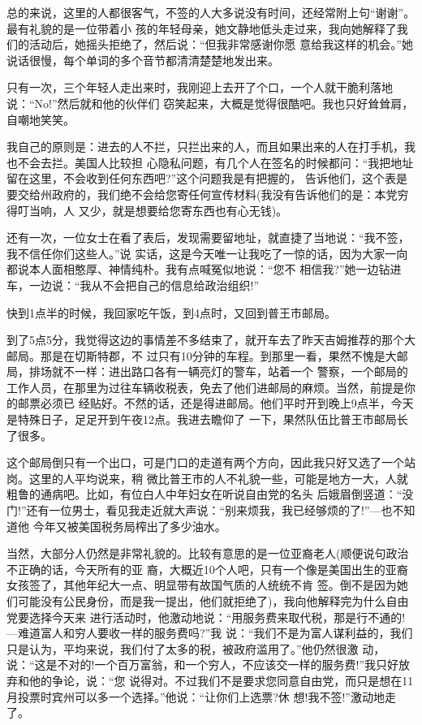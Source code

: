 ﻿\documentclass[11pt]{article}
\begin{document}
总的来说，这里的人都很客气，不签的人大多说没有时间，还经常附上句``谢谢''。最有礼貌的是一位带着小
孩的年轻母亲，她文静地低头走过来，我向她解释了我们的活动后，她摇头拒绝了，然后说：``但我非常感谢你愿
意给我这样的机会。''她说话很慢，每个单词的多个音节都清清楚楚地发出来。

只有一次，三个年轻人走出来时，我刚迎上去开了个口，一个人就干脆利落地说：``No!''然后就和他的伙伴们
窃笑起来，大概是觉得很酷吧。我也只好耸耸肩，自嘲地笑笑。

我自己的原则是：进去的人不拦，只拦出来的人，而且如果出来的人在打手机，我也不会去拦。美国人比较担
心隐私问题，有几个人在签名的时候都问：``我把地址留在这里，不会收到任何东西吧?''这个问题我是有把握的，
告诉他们，这个表是要交给州政府的，我们绝不会给您寄任何宣传材料(我没有告诉他们的是：本党穷得叮当响，人
又少，就是想要给您寄东西也有心无钱)。

还有一次，一位女士在看了表后，发现需要留地址，就直捷了当地说：``我不签，我不信任你们这些人。''说
实话，这是今天唯一让我吃了一惊的话，因为大家一向都说本人面相憨厚、神情纯朴。我有点喊冤似地说：``您不
相信我?''她一边钻进车，一边说：``我从不会把自己的信息给政治组织!''

快到1点半的时候，我回家吃午饭，到4点时，又回到普王市邮局。

到了5点5分，我觉得这边的事情差不多结束了，就开车去了昨天吉姆推荐的那个大邮局。那是在切斯特郡，不
过只有10分钟的车程。到那里一看，果然不愧是大邮局，排场就不一样：进出路口各有一辆亮灯的警车，站着一个
警察，一个邮局的工作人员，在那里为过往车辆收税表，免去了他们进邮局的麻烦。当然，前提是你的邮票必须已
经贴好。不然的话，还是得进邮局。他们平时开到晚上9点半，今天是特殊日子，足足开到午夜12点。我进去瞻仰了
一下，果然队伍比普王市邮局长了很多。

这个邮局倒只有一个出口，可是门口的走道有两个方向，因此我只好又选了一个站岗。这里的人平均说来，稍
微比普王市的人不礼貌一些，可能是地方一大，人就粗鲁的通病吧。比如，有位白人中年妇女在听说自由党的名头
后娥眉倒竖道：``没门!''还有一位男士，看见我走近就大声说：``别来烦我，我已经够烦的了!''---也不知道他
今年又被美国税务局榨出了多少油水。

当然，大部分人仍然是非常礼貌的。比较有意思的是一位亚裔老人(顺便说句政治不正确的话，今天所有的亚
裔，大概近10个人吧，只有一个像是美国出生的亚裔女孩签了，其他年纪大一点、明显带有故国气质的人统统不肯
签。倒不是因为她们可能没有公民身份，而是我一提出，他们就拒绝了)，我向他解释完为什么自由党要选择今天来
进行活动时，他激动地说：``用服务费来取代税，那是行不通的!---难道富人和穷人要收一样的服务费吗?''我
说：``我们不是为富人谋利益的，我们只是认为，平均来说，我们付了太多的税，被政府滥用了。''他仍然很激
动，说：``这是不对的!一个百万富翁，和一个穷人，不应该交一样的服务费!''我只好放弃和他的争论，说：``您
说得对。不过我们不是要求您同意自由党，而只是想在11月投票时宾州可以多一个选择。''他说：``让你们上选票?休
想!我不签!''激动地走了。
\end{document}
